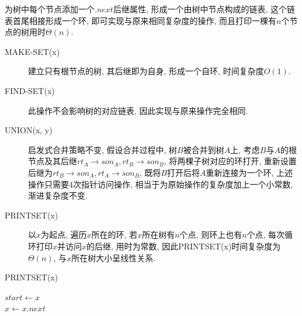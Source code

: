 \documentclass{article}
\begin{document}
为树中每个节点添加一个$.next$后继属性, 形成一个由树中节点构成的链表, 这个链表首尾相接形成一个环, 即可实现与原来相同复杂度的操作, 而且打印一棵有$n$个节点的树用时$\Theta(n)$.

\begin{description}
    \item[MAKE-SET(x)] 建立只有根节点的树, 其后继即为自身, 形成一个自环, 时间复杂度$O(1)$.
    \item[FIND-SET(x)] 此操作不会影响树的对应链表, 因此实现与原来操作完全相同.
    \item[UNION(x, y)] 启发式合并策略不变, 假设合并过程中, 树$B$被合并到树$A$上, 考虑$B$与$A$的根节点及其后继$rt_A \rightarrow son_A, rt_B \rightarrow son_B$, 将两棵子树对应的环打开, 重新设置后继为$rt_B \rightarrow son_A, rt_A \rightarrow son_B$, 既将$B$打开后将$A$重新连接为一个环, 上述操作只需要4次指针访问操作, 相当于为原始操作的复杂度加上一个小常数, 渐进复杂度不变.
    \item[PRINTSET(x)] 以$x$为起点, 遍历$x$所在的环, 若$x$所在树有$n$个点, 则环上也有$n$个点, 每次循环打印$x$并访问$x$的后继, 用时为常数, 因此PRINTSET(x)时间复杂度为$\Theta(n)$, 与$x$所在树大小呈线性关系.
\end{description}

\begin{algorithm}[H]
    \caption{PRINTSET(x)}
    $start \leftarrow x$ \\
    $x \leftarrow x.next$ \\
\end{algorithm}
\end{document}
